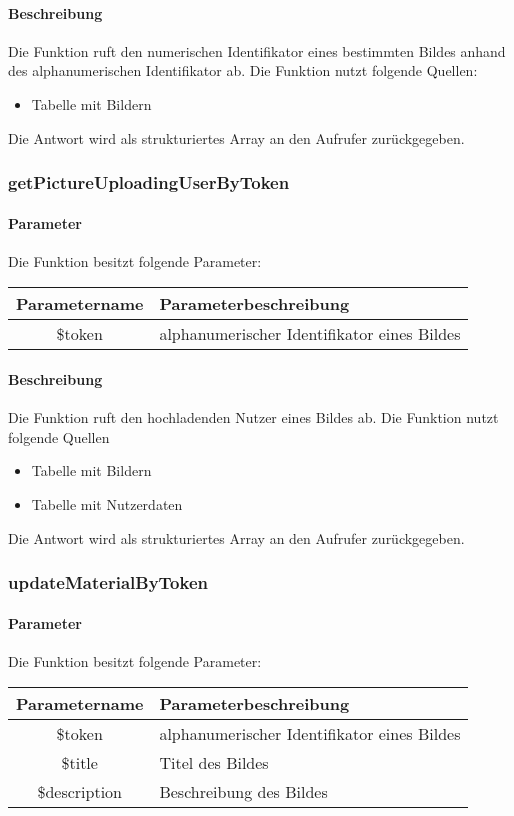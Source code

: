 \paragraph{Beschreibung} Die Funktion ruft den numerischen Identifikator eines bestimmten Bildes anhand des alphanumerischen Identifikator ab. Die Funktion nutzt folgende Quellen:
\begin{itemize}
	\item Tabelle mit Bildern
\end{itemize}
Die Antwort wird als strukturiertes Array an den Aufrufer zurückgegeben.
\subsubsection{getPictureUploadingUserByToken}
\paragraph{Parameter} Die Funktion besitzt folgende Parameter:
\begin{table}[H]
	\begin{tabular}{|c|p{11cm}|}
		\hline
		\textbf{Parametername} & \textbf{Parameterbeschreibung} \\ \hline
		\$token & alphanumerischer Identifikator eines Bildes \\ \hline
	\end{tabular}
\end{table}
\paragraph{Beschreibung} Die Funktion ruft den hochladenden Nutzer eines Bildes ab. Die Funktion nutzt folgende Quellen
\begin{itemize}
	\item Tabelle mit Bildern
	\item Tabelle mit Nutzerdaten
\end{itemize}
Die Antwort wird als strukturiertes Array an den Aufrufer zurückgegeben.
\subsubsection{updateMaterialByToken}
\paragraph{Parameter} Die Funktion besitzt folgende Parameter:
\begin{table}[H]
	\begin{tabular}{|c|p{11cm}|}
		\hline
		\textbf{Parametername} & \textbf{Parameterbeschreibung} \\ \hline
		\$token       & alphanumerischer Identifikator eines Bildes \\ \hline
		\$title       & Titel des Bildes \\ \hline
		\$description & Beschreibung des Bildes \\ \hline
	\end{tabular}
\end{table}

